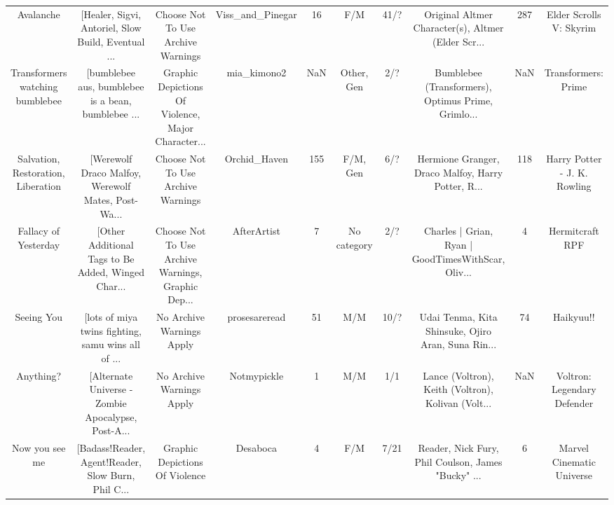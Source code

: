 \begin{table}[h!]
{\begin{tabular}{|c|c|c|c|c|c|c|c|c|c|}
                                         Avalanche & [Healer, Sigvi, Antoriel, Slow Build, Eventual ... &                 Choose Not To Use Archive Warnings &                   Viss\_and\_Pinegar &        16 &                              F/M &     41/? & Original Altmer Character(s), Altmer (Elder Scr... &      287 &                            Elder Scrolls V: Skyrim \\
                   Transformers watching bumblebee & [bumblebee aus, bumblebee is a bean, bumblebee ... & Graphic Depictions Of Violence, Major Character... &                        mia\_kimono2 &       NaN &                       Other, Gen &      2/? & Bumblebee (Transformers), Optimus Prime, Grimlo... &      NaN &                                Transformers: Prime \\
                Salvation, Restoration, Liberation & [Werewolf Draco Malfoy, Werewolf Mates, Post-Wa... &                 Choose Not To Use Archive Warnings &                       Orchid\_Haven &       155 &                         F/M, Gen &      6/? & Hermione Granger, Draco Malfoy, Harry Potter, R... &      118 &                       Harry Potter - J. K. Rowling \\
                              Fallacy of Yesterday & [Other Additional Tags to Be Added, Winged Char... & Choose Not To Use Archive Warnings, Graphic Dep... &                        AfterArtist &         7 &                      No category &      2/? & Charles | Grian, Ryan | GoodTimesWithScar, Oliv... &        4 &                                    Hermitcraft RPF \\
                                        Seeing You & [lots of miya twins fighting, samu wins all of ... &                          No Archive Warnings Apply &                      prosesareread &        51 &                              M/M &     10/? & Udai Tenma, Kita Shinsuke, Ojiro Aran, Suna Rin... &       74 &                                          Haikyuu!! \\
                                         Anything? & [Alternate Universe - Zombie Apocalypse, Post-A... &                          No Archive Warnings Apply &                        Notmypickle &         1 &                              M/M &      1/1 & Lance (Voltron), Keith (Voltron), Kolivan (Volt... &      NaN &                        Voltron: Legendary Defender \\
                                    Now you see me & [Badass!Reader, Agent!Reader, Slow Burn, Phil C... &                     Graphic Depictions Of Violence &                           Desaboca &         4 &                              F/M &     7/21 & Reader, Nick Fury, Phil Coulson, James "Bucky" ... &        6 &                          Marvel Cinematic Universe \\

\end{tabular}}
\end{table}
